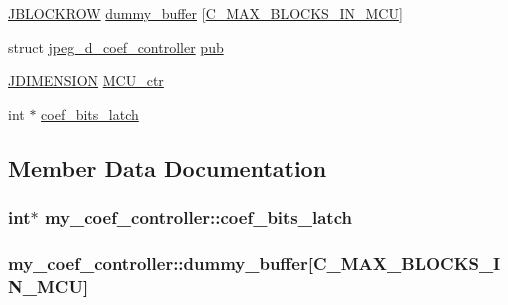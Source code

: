 \begin{DoxyCompactItemize}
\item 
\hyperlink{jpeglib_8h_a04dea0959d9bd9e8ddad83597161453b}{J\+B\+L\+O\+C\+K\+R\+O\+W} \hyperlink{structmy__coef__controller_a5cffa07081b1c4361d9dfe48373c8240}{dummy\+\_\+buffer} \mbox{[}\hyperlink{jpeglib_8h_a4f270f4efb3fc0bb09f0d5ffa51ca327}{C\+\_\+\+M\+A\+X\+\_\+\+B\+L\+O\+C\+K\+S\+\_\+\+I\+N\+\_\+\+M\+C\+U}\mbox{]}
\item 
struct \hyperlink{structjpeg__d__coef__controller}{jpeg\+\_\+d\+\_\+coef\+\_\+controller} \hyperlink{structmy__coef__controller_a09524018020a2d7edbbcd92400f0919a}{pub}
\item 
\hyperlink{jmorecfg_8h_a04ed4674f6f1d0d50ec241531e38274f}{J\+D\+I\+M\+E\+N\+S\+I\+O\+N} \hyperlink{structmy__coef__controller_a17ccbcfc9a173194725050412855d7cf}{M\+C\+U\+\_\+ctr}
\item 
int $\ast$ \hyperlink{structmy__coef__controller_a04a1fed969821365fc54733467a120b9}{coef\+\_\+bits\+\_\+latch}
\end{DoxyCompactItemize}


\subsection{Member Data Documentation}
\hypertarget{structmy__coef__controller_a04a1fed969821365fc54733467a120b9}{}
\subsubsection[{coef\+\_\+bits\+\_\+latch}]{\setlength{\rightskip}{0pt plus 5cm}int$\ast$ my\+\_\+coef\+\_\+controller\+::coef\+\_\+bits\+\_\+latch}\label{structmy__coef__controller_a04a1fed969821365fc54733467a120b9}
\hypertarget{structmy__coef__controller_a5cffa07081b1c4361d9dfe48373c8240}{}
\subsubsection[{dummy\+\_\+buffer}]{ my\+\_\+coef\+\_\+controller\+::dummy\+\_\+buffer\mbox{[}{\bf C\+\_\+\+M\+A\+X\+\_\+\+B\+L\+O\+C\+K\+S\+\_\+\+I\+N\+\_\+\+M\+C\+U}\mbox{]}}\label{structmy__coef__controller_a5cffa07081b1c4361d9dfe48373c8240}
\hypertarget{structmy__coef__controller_aebf2f540f71a3af44f75544ef474badb}{}
